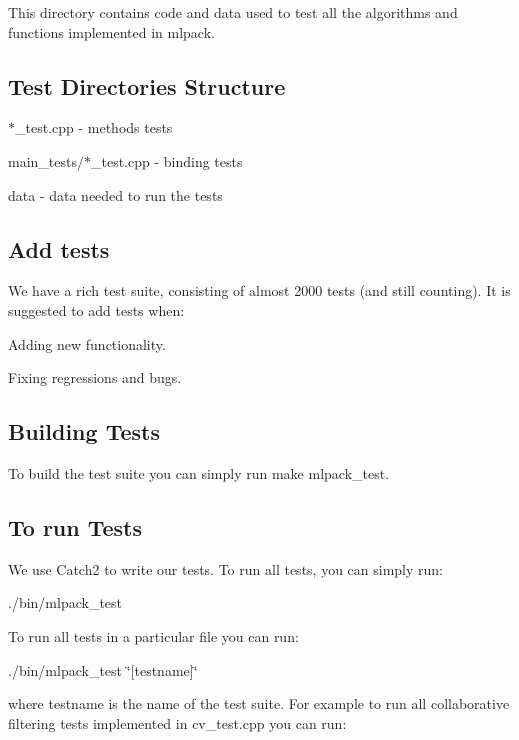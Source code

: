 This directory contains code and data used to test all the algorithms and functions implemented in mlpack.

\subsection*{Test Directories Structure}


\begin{DoxyItemize}
\item $\ast$\+\_\+test.cpp -\/ methods tests
\item main\+\_\+tests/$\ast$\+\_\+test.cpp -\/ binding tests
\item data -\/ data needed to run the tests
\end{DoxyItemize}

\subsection*{Add tests}

We have a rich test suite, consisting of almost 2000 tests (and still counting). It is suggested to add tests when\+:


\begin{DoxyItemize}
\item Adding new functionality.
\item Fixing regressions and bugs.
\end{DoxyItemize}

\subsection*{Building Tests}

To build the test suite you can simply run {\ttfamily make mlpack\+\_\+test}.

\subsection*{To run Tests}

We use {\ttfamily Catch2} to write our tests. To run all tests, you can simply run\+:

{\ttfamily ./bin/mlpack\+\_\+test}

To run all tests in a particular file you can run\+:

{\ttfamily ./bin/mlpack\+\_\+test \char`\"{}[testname]\char`\"{}}

where {\ttfamily testname} is the name of the test suite. For example to run all collaborative filtering tests implemented in {\ttfamily cv\+\_\+test.\+cpp} you can run\+:

